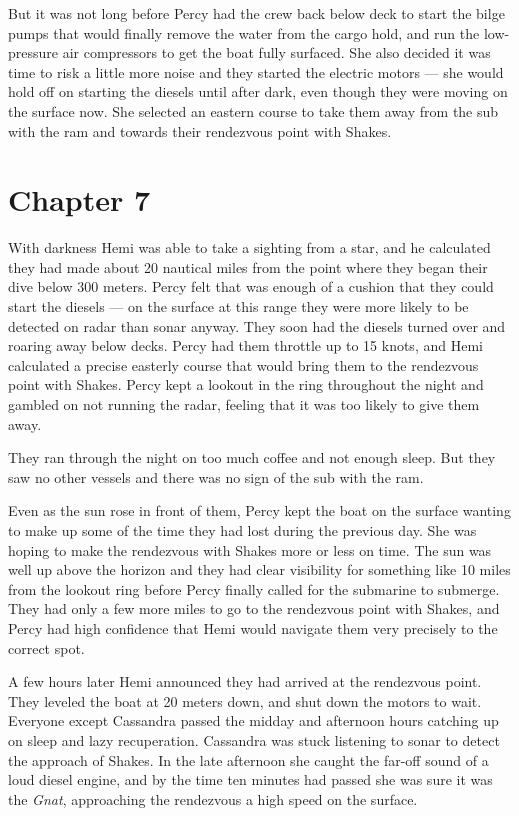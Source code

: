 \documentclass[
]{scrbook}
\begin{document}
But it was not long before Percy had the crew back below deck to start
the bilge pumps that would finally remove the water from the cargo hold,
and run the low-pressure air compressors to get the boat fully surfaced.
She also decided it was time to risk a little more noise and they
started the electric motors --- she would hold off on starting the
diesels until after dark, even though they were moving on the surface
now. She selected an eastern course to take them away from the sub with
the ram and towards their rendezvous point with Shakes.

\hypertarget{chapter-7}{%
\chapter*{Chapter 7}\label{chapter-7}}

With darkness Hemi was able to take a sighting from a star, and he
calculated they had made about 20 nautical miles from the point where
they began their dive below 300 meters. Percy felt that was enough of a
cushion that they could start the diesels --- on the surface at this
range they were more likely to be detected on radar than sonar anyway.
They soon had the diesels turned over and roaring away below decks.
Percy had them throttle up to 15 knots, and Hemi calculated a precise
easterly course that would bring them to the rendezvous point with
Shakes. Percy kept a lookout in the ring throughout the night and
gambled on not running the radar, feeling that it was too likely to give
them away.

They ran through the night on too much coffee and not enough sleep. But
they saw no other vessels and there was no sign of the sub with the ram.

Even as the sun rose in front of them, Percy kept the boat on the
surface wanting to make up some of the time they had lost during the
previous day. She was hoping to make the rendezvous with Shakes more or
less on time. The sun was well up above the horizon and they had clear
visibility for something like 10 miles from the lookout ring before
Percy finally called for the submarine to submerge. They had only a few
more miles to go to the rendezvous point with Shakes, and Percy had high
confidence that Hemi would navigate them very precisely to the correct
spot.

A few hours later Hemi announced they had arrived at the rendezvous
point. They leveled the boat at 20 meters down, and shut down the motors
to wait. Everyone except Cassandra passed the midday and afternoon hours
catching up on sleep and lazy recuperation. Cassandra was stuck
listening to sonar to detect the approach of Shakes. In the late
afternoon she caught the far-off sound of a loud diesel engine, and by
the time ten minutes had passed she was sure it was the \emph{Gnat},
approaching the rendezvous a high speed on the surface.
\end{document}

